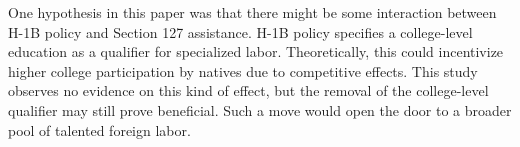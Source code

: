 \documentclass[review]{elsarticle}
\begin{document}
One hypothesis in this paper was that there might be some interaction between H-1B policy and Section 127 assistance.
H-1B policy specifies a college-level education as a qualifier for specialized labor.
Theoretically, this could incentivize higher college participation by natives due to competitive effects.
This study observes no evidence on this kind of effect,
but the removal of the college-level qualifier may still prove beneficial.
Such a move would open the door to a broader pool of talented foreign labor.






\end{document}

